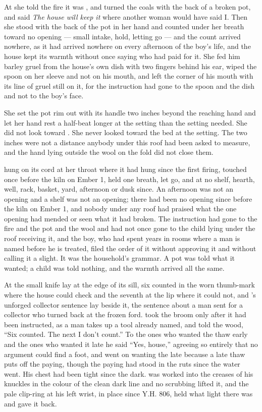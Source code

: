 At  she told the fire it was , and turned the coals with the back of a broken pot, and said \emph{The house will keep it} where another woman would have said I. Then she stood with the back of the pot in her hand and counted under her breath toward no opening --- small intake, hold, letting go --- and the count arrived nowhere, as it had arrived nowhere on every afternoon of the boy's life, and the house kept its warmth without once saying who had paid for it. She fed him barley gruel from the house's own dish with two fingers behind his ear, wiped the spoon on her sleeve and not on his mouth, and left the corner of his mouth with its line of gruel still on it, for the instruction had gone to the spoon and the dish and not to the boy's face.

She set the pot rim out with its handle two inches beyond the reaching hand and let her hand rest a half-beat longer at the setting than the setting needed. She did not look toward . She never looked toward the bed at the setting. The two inches were not a distance anybody under this roof had been asked to measure, and the hand lying outside the wool on the fold did not close them.

 hung on its cord at her throat where it had hung since the first firing, touched once before the kiln on Ember 1, held one breath, let go, and at no shelf, hearth, well, rack, basket, yard, afternoon or dusk since. An afternoon was not an opening and a shelf was not an opening; there had been no opening since before the kiln on Ember 1, and nobody under any roof had praised what the one opening had mended or seen what it had broken. The instruction had gone to the fire and the pot and the wool and had not once gone to the child lying under the roof receiving it, and the boy, who had spent years in rooms where a man is named before he is treated, filed the order of it without approving it and without calling it a slight. It was the household's grammar. A pot was told what it wanted; a child was told nothing, and the warmth arrived all the same.

\scenebreak

At  the small knife lay at the edge of its sill, six counted in the worn thumb-mark where the house could check and the seventh at the lip where it could not, and 's unforged collector sentence lay beside it, the sentence about a man sent for a collector who turned back at the frozen ford.  took the broom only after it had been instructed, as a man takes up a tool already named, and told the wood, “Six counted. The next I don't count.” To the ones who wanted the thaw early and the ones who wanted it late he said “Yes, house,” agreeing so entirely that no argument could find a foot, and went on wanting the late because a late thaw puts off the paying, though the paying had stood in the ruts since the water went. His chest had been tight since the dark.  was worked into the creases of his knuckles in the colour of the clean dark line and no scrubbing lifted it, and the pale clip-ring at his left wrist, in place since Y.H. 806, held what light there was and gave it back.

